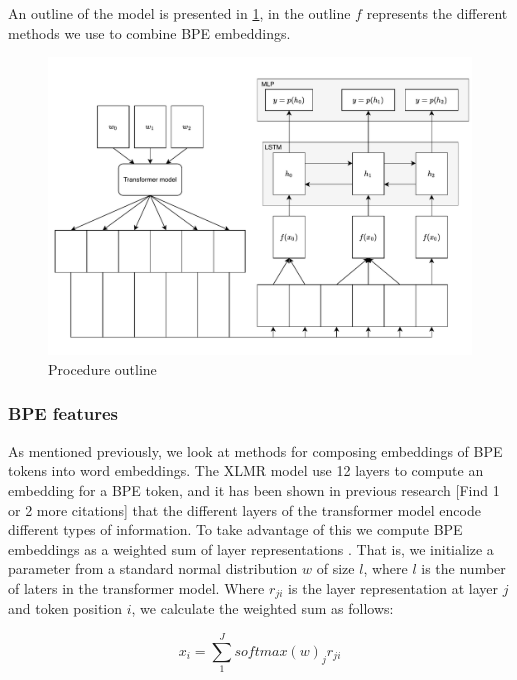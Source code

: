\documentclass[11pt]{article}
\begin{document}
	An outline of the model is presented in \cref{fig:model}, in
        the outline $f$ represents the different methods we use to
        combine BPE embeddings.
	
	\begin{figure}[h!]
		\centering
		\includegraphics[scale=0.5]{model-outline.pdf}
		\caption{\label{fig:model} Procedure outline}
	\end{figure}
	
	\subsubsection{BPE features}

                        As mentioned previously, we look at methods
     for composing embeddings of BPE tokens into word embeddings. The
     XLMR model use 12 layers to compute an embedding for a BPE token,
     and it has been shown in previous research
     \cite{kondratyukstraka,raganato2018analysis} [Find 1 or 2 more
     citations] that the different layers of the transformer model
     encode different types of information. To take advantage of this
     we compute BPE embeddings as a weighted sum of layer
     representations \cite{kondratyukstraka}.  That is, we initialize
     a parameter from a standard normal distribution $w$ of size $l$,
     where $l$ is the number of laters in the transformer model. Where
     $r_{ji}$ is the layer representation at layer $j$ and token
     position $i$, we calculate the weighted sum as follows:

    \begin{equation}
		x_i = \sum_{1}^{J} softmax(w)_j r_{ji}
	\end{equation}
\end{document}
